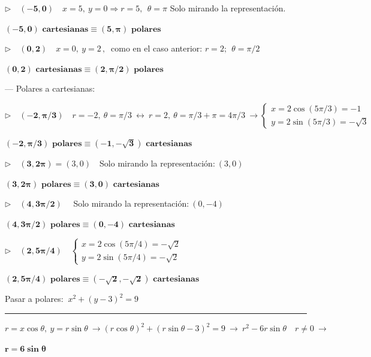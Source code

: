 \begin{miejercicio}
$\triangleright \quad \boldsymbol{(-5,0)}\quad x=5,\ y= 0 \Rightarrow r=5,\ \ \theta=\pi$ \small{Solo mirando la representación}\normalsize{.}

\hspace{5cm} $\boldsymbol{(-5,0) \text{ cartesianas} \equiv (5, \pi) \text{ polares}}$

$\triangleright \quad \boldsymbol{(0,2)} \quad x=0,\ y= 2 \, , \ $ \small{como en el caso anterior}\normalsize{:} $r=2;\ \ \theta=\pi/2$

\hspace{5cm} $\boldsymbol{(0,2) \text{ cartesianas} \equiv (2, \pi/2) \text{ polares}}$

--- Polares a cartesianas:

$\triangleright \quad \boldsymbol{(-2,\pi/3)}\quad r=-2,\ \theta = \pi/3 \ \leftrightarrow \ r=2,\ \theta=\pi/3+\pi=4\pi/3 \ \to \begin{cases} x=2\cos(5\pi/3)=-1\\ y=2\sin(5\pi/3)=-\sqrt 3 \end{cases}$ 

\hspace{5cm} $\boldsymbol{(-2,\pi/3) \text{ polares} \equiv (-1,-\sqrt 3) \text{ cartesianas}}$

$\triangleright \quad \boldsymbol{(3,2\pi)}=(3,0) \quad $\small{Solo mirando la representación}\normalsize{:}$\ (3,0)$

\hspace{5cm} $\boldsymbol{(3,2\pi) \text{ polares} \equiv (3,0) \text{ cartesianas}}$


$\triangleright \quad \boldsymbol{(4,3\pi/2)}\quad$ \small{Solo mirando la representación}\normalsize{:}$\ (0,-4)$

\hspace{5cm} $\boldsymbol{(4,3\pi/2) \text{ polares} \equiv (0,-4) \text{ cartesianas}}$

$\triangleright \quad \boldsymbol{(2,5\pi/4)}\quad \begin{cases} x=2\cos(5\pi/4)= -\sqrt 2 \\ y=2\sin(5\pi/4)=-\sqrt 2 \end{cases}$	

\hspace{5cm} $\boldsymbol{(2,5\pi/4) \text{ polares} \equiv (-\sqrt 2,-\sqrt 2) \text{ cartesianas}}$

\end{miejercicio}

\vspace{5mm}
\begin{miejercicio} 
	

Pasar a polares: $\ x^2+(y-3)^2=9$

 \rule{300pt}{0.2pt}

$r=x\cos \theta,\ y=r\sin \theta \ \to (r\cos \theta)^2+(r \sin \theta - 3)^2=9 \ \to \  r^2 - 6 r \sin \theta  \quad r\neq 0  \ \to$

\hspace{5cm} $\boldsymbol{r=6\sin \theta}$
\end{miejercicio}

